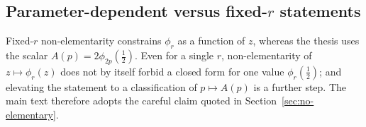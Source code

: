\subsection{Parameter-dependent versus fixed-$r$ statements}

Fixed-$r$ non-elementarity constrains $\phi_r$ as a function of $z$, whereas the thesis uses the scalar $A(p)=2\phi_{2p}(\tfrac12)$. Even for a single $r$, non-elementarity of $z\mapsto\phi_r(z)$ does not by itself forbid a closed form for one value $\phi_r(\tfrac12)$; and elevating the statement to a classification of $p\mapsto A(p)$ is a further step. The main text therefore adopts the careful claim quoted in Section~\ref{sec:no-elementary}.
